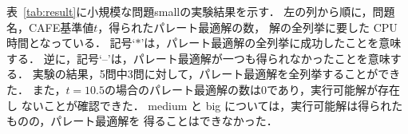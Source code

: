 表~\ref{tab:result}に小規模な問題smallの実験結果を示す．
左の列から順に，問題名，CAFE基準値$t$，得られたパレート最適解の数，
解の全列挙に要した CPU 時間となっている．
記号`$\ast$'は，パレート最適解の全列挙に成功したことを意味する．
逆に，記号`--'は，パレート最適解が一つも得られなかったことを意味する．
%
実験の結果，5問中3問に対して，パレート最適解を全列挙することができた．
また，$t=10.5$の場合のパレート最適解の数は0であり，実行可能解が存在し
ないことが確認できた．
medium と big については，実行可能解は得られたものの，パレート最適解を
得ることはできなかった．

